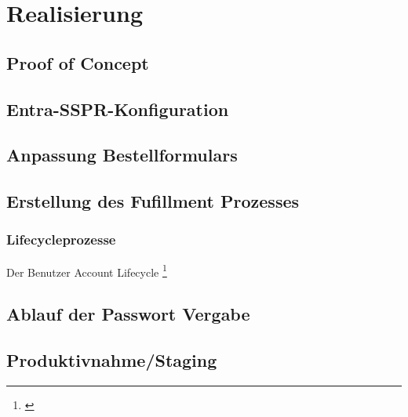 \chapter{Realisierung}
\lipsum[1]

\section{Proof of Concept}
\lipsum[1]



\section{Entra-SSPR-Konfiguration}
\lipsum[1]

\section{Anpassung Bestellformulars}
\lipsum[1]

\section{Erstellung des Fufillment Prozesses} 
\lipsum[1]

\subsection{Lifecycleprozesse} \label{Lifecycleprozess}
Der Benutzer Account Lifecycle \footnote{\cite[Was ist der User Account Lifecycle?]{lifecycle}}
\lipsum[1]

\section{Ablauf der Passwort Vergabe}
\lipsum[1]

\section{Produktivnahme/Staging}
\lipsum[1]
